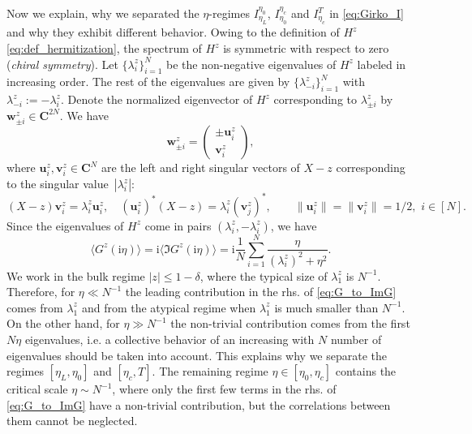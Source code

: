 \documentclass[10pt]{amsart}
\numberwithin{equation}{section}
\newcommand{\C}{\mathbf{C}}
\newcommand{\ii}{\mathrm{i}}
\begin{document}
Now we explain, why we separated the $\eta$-regimes $I_{\eta_L}^{\eta_0}$, $I_{\eta_0}^{\eta_c}$ and $I_{\eta_c}^T$ in \eqref{eq:Girko_I} and why they exhibit different behavior. Owing to the definition of $H^z$ \eqref{eq:def_hermitization}, the spectrum of $H^z$ is symmetric with respect to zero (\emph{chiral symmetry}). Let $\{\lambda^z_i\}_{i=1}^N$ be the non-negative eigenvalues of $H^z$ labeled in increasing order. The rest of the eigenvalues are given by $\{\lambda^z_{-i}\}_{i=1}^N$ with $\lambda_{-i}^z:=-\lambda_i^z$. Denote the normalized eigenvector of $H^z$ corresponding to $\lambda_{\pm i}^z$ by $\bm{w}_{\pm i}^z\in\C^{2N}$. We have
\begin{equation}
\bm{w}_{\pm i}^z =\begin{pmatrix}
\pm \bm{u}_i^z\\\bm{v}_i^z
\end{pmatrix},
\label{eq:eigenvectors_symmetry}
\end{equation}
where $\bm{u}_i^z, \bm{v}_i^z\in\C^{N}$ are the left and right singular vectors of $X-z$ corresponding to the singular value~$|\lambda_i^z|$:
\begin{equation}
(X-z)\bm{v}_i^z = \lambda_i^z\bm{u}_i^z,\quad (\bm{u}_i^z)^*(X-z) = \lambda_i^z (\bm{v}_j^z)^*,\qquad \|\bm{u}_i^z\|=\|\bm{v}_i^z\|=1/2,\,\, i\in [N].
\label{eq:def_uv}
\end{equation}
Since the eigenvalues of $H^z$ come in pairs $(\lambda_i^z,-\lambda_i^z)$, we have
\begin{equation}
\langle G^z(\ii\eta)\rangle = \ii\langle \Im G^z(\ii\eta)\rangle = \ii\frac{1}{N}\sum_{i=1}^N \frac{\eta}{(\lambda_i^z)^2+\eta^2}.
\label{eq:G_to_ImG}
\end{equation}
We work in the bulk regime $|z|\le 1-\delta$, where the typical size of $\lambda_1^z$ is $N^{-1}$. Therefore, for $\eta\ll N^{-1}$ the leading contribution in the rhs. of \eqref{eq:G_to_ImG} comes from $\lambda_1^z$ and from the atypical regime when $\lambda_1^z$ is much smaller than $N^{-1}$. On the other hand, for $\eta\gg N^{-1}$ the non-trivial contribution comes from the first $N\eta$ eigenvalues, i.e. a collective behavior of an increasing with $N$ number of eigenvalues should be taken into account. This explains why we separate the regimes $[\eta_L,\eta_0]$ and $[\eta_c,T]$.  The remaining regime $\eta\in [\eta_0,\eta_c]$ contains the critical scale $\eta\sim N^{-1}$, where only the first few terms in the rhs. of \eqref{eq:G_to_ImG} have a non-trivial contribution, but the correlations between them cannot be neglected.  
\end{document}
